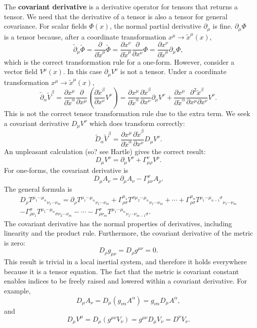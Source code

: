 \documentclass[11pt]{article}
\begin{document}
The \textbf{covariant derivative} is a derivative operator for tensors that returns a tensor.
We need that the derivative of a tensor is also a tensor for general covariance.
For scalar fields $\Phi(x)$, the normal partial derivative $\partial_\mu$ is fine. $\partial_\mu \Phi$ is a tensor because, after a coordinate transformation $x^\mu \rightarrow \tilde{x}^\mu(x)$,
$$ \tilde{\partial}_\mu \tilde{\Phi} = \frac{\partial}{\partial \tilde{x}^\mu} \tilde{\Phi} = \frac{\partial x^\nu}{\partial \tilde{x}^\mu} \frac{\partial}{\partial x^\nu} \Phi = \frac{\partial x^\nu}{\partial \tilde{x}^\mu} \partial_\mu \Phi, $$
which is the correct transformation rule for a one-form.
However, consider a vector field $V^\mu(x)$.
In this case $\partial_\mu V^\nu$ is not a tensor.
Under a coordinate transformation $x^\mu \rightarrow \tilde{x}^\mu(x)$,
$$ \tilde{\partial}_\alpha \tilde{V}^\beta = \frac{\partial x^\mu}{\partial \tilde{x}^\alpha} \frac{\partial}{\partial x^\mu} \left( \frac{\partial \tilde{x}^\beta}{\partial x^\nu} V^\nu \right) = \frac{\partial x^\mu}{\partial \tilde{x}^\alpha} \frac{\partial \tilde{x}^\beta}{\partial x^\nu} \partial_\mu V^\nu + \frac{\partial x^\mu}{\partial \tilde{x}^\alpha} \frac{\partial^2 \tilde{x}^\beta}{\partial x^\mu \partial x^\nu} V^\nu. $$
This is not the correct tensor transformation rule due to the extra term.
We seek a covariant derivative $D_\mu V^\nu$ which does transform correctly:
$$ \tilde{D}_\alpha \tilde{V}^\beta =  \frac{\partial x^\mu}{\partial \tilde{x}^\alpha} \frac{\partial \tilde{x}^\beta}{\partial x^\nu} D_\mu V^\nu. $$
An unpleasant calculation (so? see Hartle) gives the correct result:
$$ D_\mu V^\nu = \partial_\mu V^\nu + \Gamma^\nu_{\mu \rho} V^\rho. $$
For one-forms, the covariant derivative is
$$ D_\mu A_\nu = \partial_\mu A_\nu - \Gamma^\rho_{\mu \nu} A_\rho. $$
The general formula is
\begin{multline*}
D_\rho T^{\mu_1 \cdots \mu_n}{}_{\nu_1 \cdots \nu_m} = \partial_\rho T^{\mu_1 \cdots \mu_n}{}_{\nu_1 \cdots \nu_m} + \Gamma^{\mu_1}_{\rho \sigma} T^{\sigma \mu_2 \cdots \mu_n}{}_{\nu_1 \cdots \nu_m} + \cdots + \Gamma^{\mu_n}_{\rho \sigma} T^{\mu_1 \cdots \mu_{n-1} \sigma}{}_{\nu_1 \cdots \nu_m} \\  - \Gamma^{\sigma}_{\rho \nu_1} T^{\mu_1 \cdots \mu_n}{}_{\sigma \nu_2 \cdots \nu_m} - \cdots - \Gamma^{\sigma}_{\rho \nu_m} T^{\mu_1 \cdots \mu_n}{}_{\nu_1 \cdots \nu_{m-1} \sigma}.
\end{multline*}
The covariant derivative has the normal properties of derivatives, including linearity and the product rule.
Furthermore, the covariant derivative of the metric is zero:
$$ D_\rho g_{\mu \nu} = D_\rho g^{\mu \nu} = 0. $$
This result is trivial in a local inertial system, and therefore it holds everywhere because it is a tensor equation.
The fact that the metric is covariant constant enables indices to be freely raised and lowered within a covariant derivative.
For example,
$$ D_\mu A_\nu = D_\mu (g_{\nu \alpha} A^\alpha) = g_{\nu \alpha} D_\mu A^\alpha, $$
and
$$ D_\mu V^\mu = D_\mu (g^{\mu \nu} V_\nu) = g^{\mu \nu} D_\mu V_\nu = D^\nu V_\nu. $$
\end{document}
